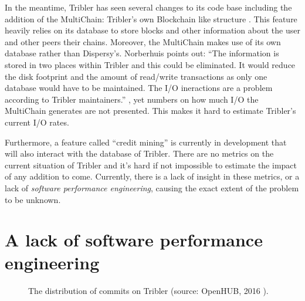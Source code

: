 In the meantime, Tribler has seen several changes to its code base including the addition of the MultiChain: Tribler's own Blockchain like structure \cite{norberhuis2015multichain}.
This feature heavily relies on its database to store blocks and other information about the user and other peers their chains.
Moreover, the MultiChain makes use of its own database rather than Dispersy's.
Norberhuis points out: \enquote{The information is stored in two places within Tribler and this could be eliminated. It would reduce the disk footprint and the amount of read/write transactions as only one database would have to be maintained. The I/O ineractions are a problem according to Tribler maintainers.} \cite{norberhuis2015multichain}, yet numbers on how much I/O the MultiChain generates are not presented.
This makes it hard to estimate Tribler's current I/O rates.

Furthermore, a feature called \enquote{credit mining} is currently in development that will also interact with the database of Tribler.
There are no metrics on the current situation of Tribler and it's hard if not impossible to estimate the impact of any addition to come.
Currently, there is a lack of insight in these metrics, or a lack of \emph{software performance engineering}, causing the exact extent of the problem to be unknown.


\section{A lack of software performance engineering}

\begin{figure}[!h]
	\caption{The distribution of commits on Tribler (source: OpenHUB, 2016 \cite{openhub2016tribler}).}
	\label{fig:commits_openhub}
\end{figure}

